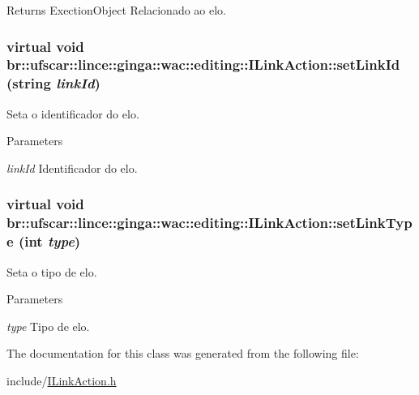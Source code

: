 \begin{DoxyReturn}{Returns}
ExectionObject Relacionado ao elo. 
\end{DoxyReturn}
\hypertarget{classbr_1_1ufscar_1_1lince_1_1ginga_1_1wac_1_1editing_1_1ILinkAction_afc323d02257e3756375d96c0fc6d25b3}{
\subsubsection[{setLinkId}]{\setlength{\rightskip}{0pt plus 5cm}virtual void br::ufscar::lince::ginga::wac::editing::ILinkAction::setLinkId (string {\em linkId})}}
\label{classbr_1_1ufscar_1_1lince_1_1ginga_1_1wac_1_1editing_1_1ILinkAction_afc323d02257e3756375d96c0fc6d25b3}


Seta o identificador do elo. 


\begin{DoxyParams}{Parameters}
\item[{\em linkId}]Identificador do elo. \end{DoxyParams}
\hypertarget{classbr_1_1ufscar_1_1lince_1_1ginga_1_1wac_1_1editing_1_1ILinkAction_a9149a899e903cc72318112ef35a22f5f}{
\subsubsection[{setLinkType}]{\setlength{\rightskip}{0pt plus 5cm}virtual void br::ufscar::lince::ginga::wac::editing::ILinkAction::setLinkType (int {\em type})}}
\label{classbr_1_1ufscar_1_1lince_1_1ginga_1_1wac_1_1editing_1_1ILinkAction_a9149a899e903cc72318112ef35a22f5f}


Seta o tipo de elo. 


\begin{DoxyParams}{Parameters}
\item[{\em type}]Tipo de elo. \end{DoxyParams}


The documentation for this class was generated from the following file:\begin{DoxyCompactItemize}
\item 
include/\hyperlink{ILinkAction_8h}{ILinkAction.h}\end{DoxyCompactItemize}
